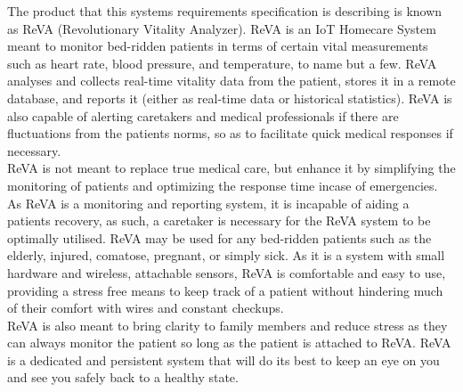The product that this systems requirements specification is describing is known as ReVA (Revolutionary Vitality Analyzer).
ReVA is an IoT Homecare System meant to monitor bed-ridden patients in terms of certain vital measurements such as heart rate, blood pressure,
and temperature, to name but a few. ReVA analyses and collects real-time vitality data from the patient, stores it in a remote database, and
reports it (either as real-time data or historical statistics). ReVA is also capable of alerting caretakers and medical professionals if there 
are fluctuations from the patients norms, so as to facilitate quick medical responses if necessary.\\ReVA is not meant to replace true medical 
care, but enhance it by simplifying the monitoring of patients and optimizing the response time incase of emergencies. As ReVA is a 
monitoring and reporting system, it is incapable of aiding a patients recovery, as such, a caretaker is necessary for the ReVA system 
to be optimally utilised. ReVA may be used for any bed-ridden patients such as the elderly, injured, comatose, pregnant, or simply sick. As it 
is a system with small hardware and wireless, attachable sensors, ReVA is comfortable and easy to use, providing a stress free means to keep track 
of a patient without hindering much of their comfort with wires and constant checkups.\\ReVA is also meant to bring clarity to family members 
and reduce stress as they can always monitor the patient so long as the patient is attached to ReVA. ReVA is a dedicated and persistent 
system that will do its best to keep an eye on you and see you safely back to a healthy state. 
